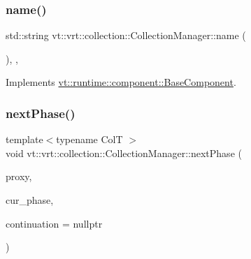 \mbox{\label{structvt_1_1vrt_1_1collection_1_1_collection_manager_af7cc4c83ae2792595eee99a3206ed633}} 
\subsubsection{\texorpdfstring{name()}{name()}}
{\footnotesize\ttfamily std\+::string vt\+::vrt\+::collection\+::\+Collection\+Manager\+::name (\begin{DoxyParamCaption}{ }\end{DoxyParamCaption})\hspace{0.3cm}{\ttfamily [inline]}, {\ttfamily [override]}, {\ttfamily [virtual]}}



Implements \hyperlink{structvt_1_1runtime_1_1component_1_1_base_component_a7701485f3539f78d42e6bad47fc7eb78}{vt\+::runtime\+::component\+::\+Base\+Component}.

\mbox{\label{structvt_1_1vrt_1_1collection_1_1_collection_manager_aa9d5a1889d871bce9c49552847e50386}} 
\subsubsection{\texorpdfstring{next\+Phase()}{nextPhase()}}
{\footnotesize\ttfamily template$<$typename ColT $>$ \\
void vt\+::vrt\+::collection\+::\+Collection\+Manager\+::next\+Phase (\begin{DoxyParamCaption}\item[{\hyperlink{structvt_1_1vrt_1_1collection_1_1_collection_manager_a56458ed7f9bb22b631b9b3a745f42f94}{Collection\+Proxy\+Wrap\+Type}$<$ ColT, typename Col\+T\+::\+Index\+Type $>$ const \&}]{proxy,  }\item[{\hyperlink{namespacevt_a46ce6733d5cdbd735d561b7b4029f6d7}{Phase\+Type} const \&}]{cur\+\_\+phase,  }\item[{\hyperlink{structvt_1_1vrt_1_1collection_1_1_collection_manager_a2649daab7b437e1e2bdb5f2eefff29b6}{Action\+Finished\+L\+B\+Type}}]{continuation = {\ttfamily nullptr} }\end{DoxyParamCaption})}


